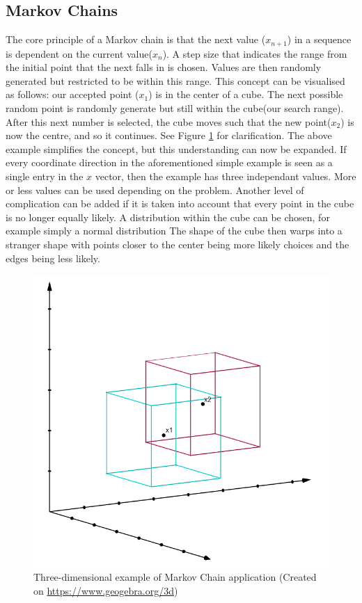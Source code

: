 	\subsection{Markov Chains}	\label{markovexpl}
	The core principle of a Markov chain is that the next value ($x_{n+1}$) in a sequence is dependent on the current value($x_n$). 
	A step size that indicates the range from the initial point that the next falls in is chosen. 
	Values are then randomly generated but restricted to be within this range.
	This concept can be visualised as follows: our accepted point ($x_1$) is in the center of a cube. The next possible random point is randomly generate but still within the cube(our search range). 	
	After this next number is selected, the cube moves such that the new point($x_2$) is now the centre, and so it continues.
	See Figure \ref{cubeexplfig} for clarification.
	The above example simplifies the concept, but this understanding can now be expanded.
	If every coordinate direction in the aforementioned simple example is seen as a single entry in the $x$ vector, then the example has three independant values.
	More or less values can be used depending on the problem.
	Another level of complication can be added if it is taken into account that every point in the cube is no longer equally likely.
	A distribution within the cube can be chosen, for example simply a normal distribution
	The shape of the cube then warps into a stranger shape with points closer to the center being more likely choices and the edges being less likely.
	\begin{figure}	
	\centering
	\includegraphics[width=0.55\linewidth]{figures/MC_cubes.png}
	\caption{Three-dimensional example of Markov Chain application (Created on \url{https://www.geogebra.org/3d})}
	\label{cubeexplfig}
	\end{figure}
	
